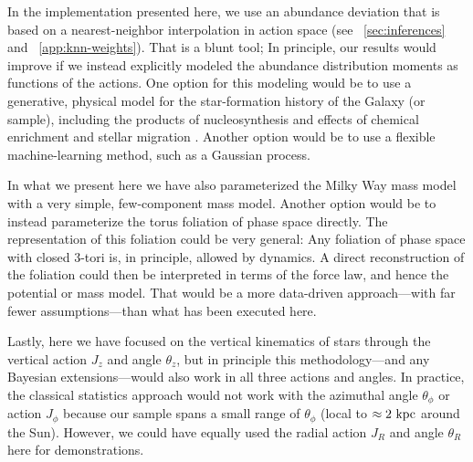 \documentclass[modern]{aastex63}
\begin{document}
In the implementation presented here, we use an abundance deviation that is
based on a nearest-neighbor interpolation in action space (see
\sectionname~\ref{sec:inferences} and \appendixname~\ref{app:knn-weights}).
That is a blunt tool; In principle, our results would improve if we instead
explicitly modeled the abundance distribution moments as functions of the
actions.
One option for this modeling would be to use a generative, physical model for
the star-formation history of the Galaxy (or sample), including the products of
nucleosynthesis and effects of chemical enrichment and stellar migration
\citep[similar to what is done in][]{Sanders:2015}.
Another option would be to use a flexible machine-learning method, such as a
Gaussian process.

In what we present here we have also parameterized the Milky Way mass model with
a very simple, few-component mass model.
Another option would be to instead parameterize the torus foliation of phase
space directly.
The representation of this foliation could be very general: Any foliation of
phase space with closed 3-tori is, in principle, allowed by dynamics.
A direct reconstruction of the foliation could then be interpreted in terms of
the force law, and hence the potential or mass model.
That would be a more data-driven approach---with far fewer assumptions---than
what has been executed here.

Lastly, here we have focused on the vertical kinematics of stars through the
vertical action $J_z$ and angle $\theta_z$, but in principle this
methodology---and any Bayesian extensions---would also work in all three actions
and angles.
In practice, the classical statistics approach would not work with the azimuthal
angle $\theta_\phi$ or action $J_\phi$ because our sample spans a small range of
$\theta_\phi$ (local to $\approx 2~\mathrm{kpc}$ around the Sun).
However, we could have equally used the radial action $J_R$ and angle $\theta_R$
here for demonstrations.


\end{document}
